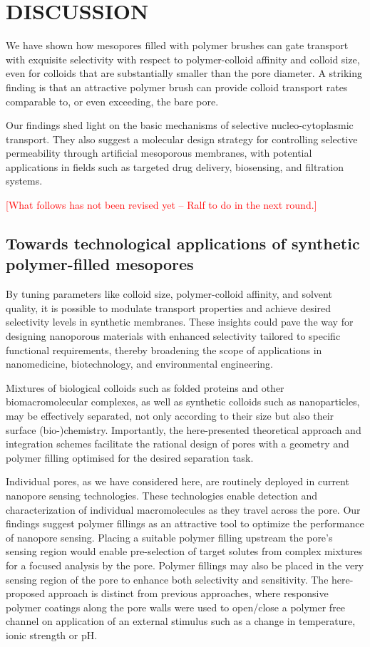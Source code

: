 \documentclass[12pt, a4paper]{article}
\newcommand\todo[1]{\textcolor{red}{#1}}
\begin{document}
\section{DISCUSSION}

We have shown how mesopores filled with polymer brushes can gate transport with exquisite selectivity with respect to polymer-colloid affinity and colloid size, even for colloids that are substantially smaller than the pore diameter.
A striking finding is that an attractive polymer brush can provide colloid transport rates comparable to, or even exceeding, the bare pore.

Our findings shed light on the basic mechanisms of selective nucleo-cytoplasmic transport. They also suggest a molecular design strategy for controlling selective permeability through artificial mesoporous membranes, with potential applications in fields such as targeted drug delivery, biosensing, and filtration systems.

\todo{[What follows has not been revised yet -- Ralf to do in the next round.]}

\subsection{Towards technological applications of synthetic polymer-filled mesopores}

By tuning parameters like colloid size, polymer-colloid affinity, and solvent quality, it is possible to modulate transport properties and achieve desired selectivity levels in synthetic membranes.
These insights could pave the way for designing nanoporous materials with enhanced selectivity tailored to specific functional requirements, thereby broadening the scope of applications in nanomedicine, biotechnology, and environmental engineering.

Mixtures of biological colloids such as folded proteins and other biomacromolecular complexes, as well as synthetic colloids such as nanoparticles, may be effectively separated, not only according to their size but also their surface (bio-)chemistry.
Importantly, the here-presented theoretical approach and integration schemes facilitate the rational design of pores with a geometry and polymer filling optimised for the desired separation task.

Individual pores, as we have considered here, are routinely deployed in current nanopore sensing technologies.
These technologies enable detection and characterization of individual macromolecules as they travel across the pore.
Our findings suggest polymer fillings as an attractive tool to optimize the performance of nanopore sensing.
Placing a suitable polymer filling upstream the pore's sensing region would enable pre-selection of target solutes from complex mixtures for a focused analysis by the pore.
Polymer fillings may also be placed in the very sensing region of the pore to enhance both selectivity and sensitivity.
The here-proposed approach is distinct from previous approaches, where responsive polymer coatings along the pore walls were used to open/close a polymer free channel on application of an external stimulus such as a change in temperature, ionic strength or pH. 
\end{document}
